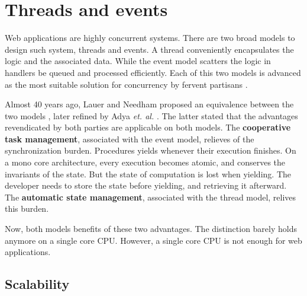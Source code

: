 \section{Threads and events}

Web applications are highly concurrent systems.
There are two broad models to design such system, threads and events.
A thread conveniently encapsulates the logic and the associated data.
While the event model scatters the logic in handlers be queued and processed efficiently.
Each of this two models is advanced as the most suitable solution for concurrency by fervent partisans \cite{Ousterhout1996, Behren2003}.

Almost 40 years ago, Lauer and Needham proposed an equivalence between the two models \cite{Lauer1979}, later refined by Adya \textit{et. al.} \cite{Adya2002}.
The latter stated that the advantages revendicated by both parties are applicable on both models.
The \textbf{cooperative task management}, associated with the event model, relieves of the synchronization burden.
Procedures yields whenever their execution finishes.
On a mono core architecture, every execution becomes atomic, and conserves the invariants of the state.
But the state of computation is lost when yielding.
The developer needs to store the state before yielding, and retrieving it afterward.
The \textbf{automatic state management}, associated with the thread model, relives this burden.

Now, both models benefits of these two advantages.
The distinction barely holds anymore on a single core CPU.
However, a single core CPU is not enough for web applications.

\subsection{Scalability}

